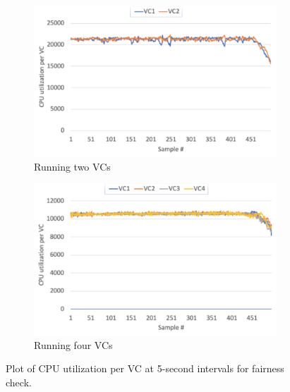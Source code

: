 \begin{figure}[!t]
   \begin{center}
      \begin{subfigure}[b]{0.45\textwidth}
         \includegraphics[width=\textwidth]{Figures/per_cluster_utilization_2.pdf}
         \caption{Running two VCs}
     \end{subfigure}
     \hfill
     \vspace{0.2in}
     \begin{subfigure}[b]{0.45\textwidth}
         \includegraphics[width=\textwidth]{Figures/per_cluster_utilization_4.pdf}
         \caption{Running four VCs}
     \end{subfigure}
   \end{center}
   \caption{Plot of CPU utilization per VC at 5-second intervals for fairness check.}
   \label{fig:per_cluster_utilization}
 \end{figure}

